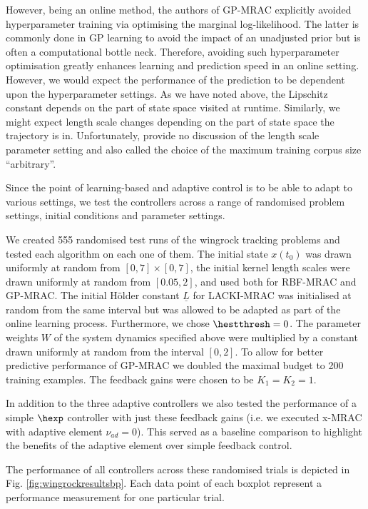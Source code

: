 However, being an online method, the authors of GP-MRAC explicitly avoided hyperparameter training via optimising the marginal log-likelihood. The latter is commonly done in GP learning \cite{GPbook:2006} to avoid the impact of an unadjusted prior but is often a computational bottle neck. Therefore, avoiding such hyperparameter optimisation greatly enhances learning and prediction speed in an online setting. However, we would expect the performance of the prediction to be dependent upon the hyperparameter settings. As we have noted above, the Lipschitz constant depends on the part of state space visited at runtime. Similarly, we might expect length scale changes depending on the part of state space the trajectory is in. Unfortunately, \cite{Chowdhary2013,ChowdharyCDC2013,chowdharyacc2013} provide no discussion of the length scale parameter setting and also called the choice of the maximum training corpus size ``arbitrary''. 

Since the point of learning-based and adaptive control is to be able to adapt to various settings, we test the controllers across a range of randomised problem settings, initial conditions and parameter settings.

We created 555 randomised test runs of the wingrock tracking problems and tested each algorithm on each one of them. The initial state $x(t_0)$ was drawn uniformly at random from $[0,7] \times [0,7]$, the initial kernel length scales were drawn uniformly at random from $[0.05,2]$, and used both for RBF-MRAC and GP-MRAC. The initial H\"older constant $\underline L$ for LACKI-MRAC was initialised at random from the same interval but was allowed to be adapted as part of the online learning process. Furthermore, we chose $\hestthresh =0$. The parameter weights $W$ of the system dynamics specified above were multiplied by a constant drawn uniformly at random from the interval $[0,2]$. To allow for better predictive performance of GP-MRAC we doubled the maximal budget to 200 training examples. 
The feedback gains were chosen to be $K_1=K_2=1$. 

In addition to the three adaptive controllers we also tested the performance of a simple $\hexp$ controller with just these feedback gains (i.e. we executed x-MRAC with adaptive element $\nu_{ad}=0$). This served as a baseline comparison to highlight the benefits of the adaptive element over simple feedback control.

The performance of all controllers across these randomised trials is depicted in Fig. \ref{fig:wingrockresultsbp}. Each data point of each boxplot represent a performance measurement for one particular trial.

